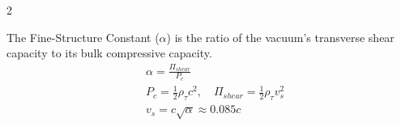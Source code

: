 \begin{multicols}{2}
\begin{tcolorbox}[cheatbox, title={\refstepcounter{cheatnum}\label{box:fine_structure}\thecheatnum. The Fine-Structure Constant \& Shear \hfill\makebox[0pt][r]{\scriptsize\hyperref[sec:deriv_fine_structure]{[Proof $\downarrow$]}}}]
The Fine-Structure Constant ($\alpha$) is the ratio of the vacuum's transverse shear capacity to its bulk compressive capacity. 
\begin{align}
    &\alpha = \frac{\Pi_{shear}}{P_c}   \label{eq:alpha_ratio} \\
    &P_c = \frac{1}{2} \rho_\tau c^2, \quad \Pi_{shear} = \frac{1}{2} \rho_\tau v_s^2  \label{eq:longitudinal_capacity} \\
    &v_s = c \sqrt{\alpha} \approx 0.085c  \label{eq:bare_shear_velocity}
\end{align}
\end{tcolorbox}


\end{multicols}
